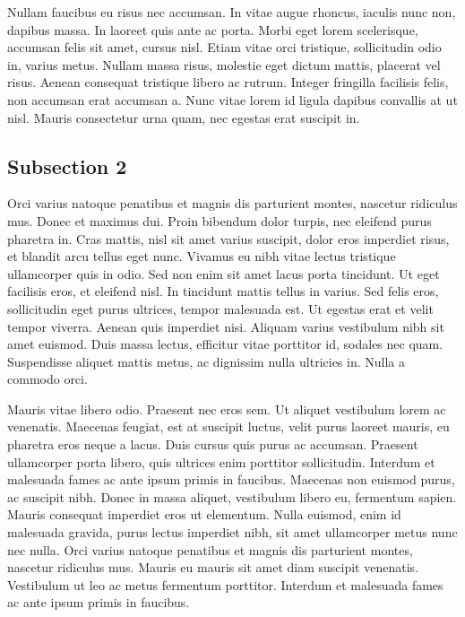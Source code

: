 {Nullam faucibus eu risus nec accumsan. In vitae augue rhoncus, iaculis nunc non, dapibus massa. In laoreet quis ante ac porta. Morbi eget lorem scelerisque, accumsan felis sit amet, cursus nisl. Etiam vitae orci tristique, sollicitudin odio in, varius metus. Nullam massa risus, molestie eget dictum mattis, placerat vel risus. Aenean consequat tristique libero ac rutrum. Integer fringilla facilisis felis, non accumsan erat accumsan a. Nunc vitae lorem id ligula dapibus convallis at ut nisl. Mauris consectetur urna quam, nec egestas erat suscipit in.

\subsection{Subsection 2}

Orci varius natoque penatibus et magnis dis parturient montes, nascetur ridiculus mus. Donec et maximus dui. Proin bibendum dolor turpis, nec eleifend purus pharetra in. Cras mattis, nisl sit amet varius suscipit, dolor eros imperdiet risus, et blandit arcu tellus eget nunc. Vivamus eu nibh vitae lectus tristique ullamcorper quis in odio. Sed non enim sit amet lacus porta tincidunt. Ut eget facilisis eros, et eleifend nisl. In tincidunt mattis tellus in varius. Sed felis eros, sollicitudin eget purus ultrices, tempor malesuada est. Ut egestas erat et velit tempor viverra. Aenean quis imperdiet nisi. Aliquam varius vestibulum nibh sit amet euismod. Duis massa lectus, efficitur vitae porttitor id, sodales nec quam. Suspendisse aliquet mattis metus, ac dignissim nulla ultricies in. Nulla a commodo orci.

Mauris vitae libero odio. Praesent nec eros sem. Ut aliquet vestibulum lorem ac venenatis. Maecenas feugiat, est at suscipit luctus, velit purus laoreet mauris, eu pharetra eros neque a lacus. Duis cursus quis purus ac accumsan. Praesent ullamcorper porta libero, quis ultrices enim porttitor sollicitudin. Interdum et malesuada fames ac ante ipsum primis in faucibus. Maecenas non euismod purus, ac suscipit nibh. Donec in massa aliquet, vestibulum libero eu, fermentum sapien. Mauris consequat imperdiet eros ut elementum. Nulla euismod, enim id malesuada gravida, purus lectus imperdiet nibh, sit amet ullamcorper metus nunc nec nulla. Orci varius natoque penatibus et magnis dis parturient montes, nascetur ridiculus mus. Mauris eu mauris sit amet diam suscipit venenatis. Vestibulum ut leo ac metus fermentum porttitor. Interdum et malesuada fames ac ante ipsum primis in faucibus.

}
